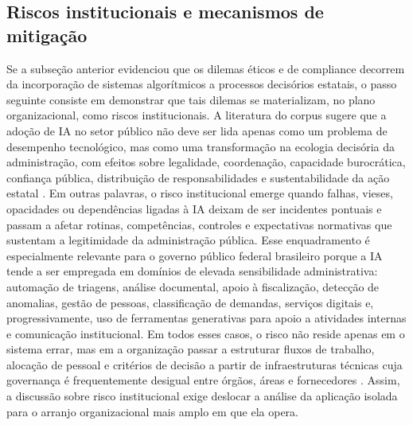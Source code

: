 \documentclass[12pt,a4paper]{article}
\begin{document}
\subsection{Riscos institucionais e mecanismos de mitigação}
\label{sec:orgdddb57c}
Se a subseção anterior evidenciou que os dilemas éticos e de compliance decorrem da incorporação de sistemas algorítmicos a processos decisórios estatais, o passo seguinte consiste em demonstrar que tais dilemas se materializam, no plano organizacional, como riscos institucionais. A literatura do corpus sugere que a adoção de IA no setor público não deve ser lida apenas como um problema de desempenho tecnológico, mas como uma transformação na ecologia decisória da administração, com efeitos sobre legalidade, coordenação, capacidade burocrática, confiança pública, distribuição de responsabilidades e sustentabilidade da ação estatal \autocite{criado2024artificial} \autocite{madan2022ai} \autocite{batool2025ai}. Em outras palavras, o risco institucional emerge quando falhas, vieses, opacidades ou dependências ligadas à IA deixam de ser incidentes pontuais e passam a afetar rotinas, competências, controles e expectativas normativas que sustentam a legitimidade da administração pública.
Esse enquadramento é especialmente relevante para o governo público federal brasileiro porque a IA tende a ser empregada em domínios de elevada sensibilidade administrativa: automação de triagens, análise documental, apoio à fiscalização, detecção de anomalias, gestão de pessoas, classificação de demandas, serviços digitais e, progressivamente, uso de ferramentas generativas para apoio a atividades internas e comunicação institucional. Em todos esses casos, o risco não reside apenas em o sistema errar, mas em a organização passar a estruturar fluxos de trabalho, alocação de pessoal e critérios de decisão a partir de infraestruturas técnicas cuja governança é frequentemente desigual entre órgãos, áreas e fornecedores \autocite{mariano2026inteligencia} \autocite{lyrio2025emerging} \autocite{goulart2025processos}. Assim, a discussão sobre risco institucional exige deslocar a análise da aplicação isolada para o arranjo organizacional mais amplo em que ela opera.
\end{document}
